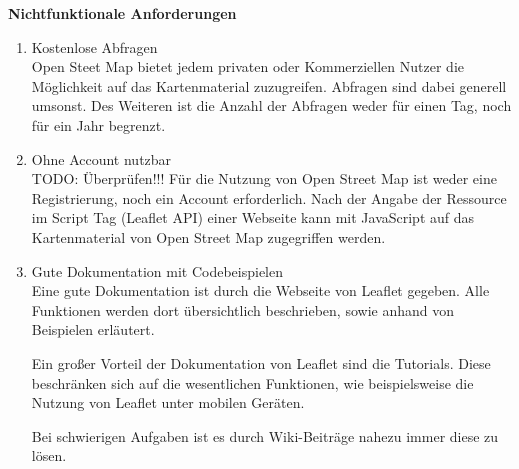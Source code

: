 \textbf{Nichtfunktionale Anforderungen}
\begin{enumerate}
\item Kostenlose Abfragen \\
Open Steet Map bietet jedem privaten oder Kommerziellen Nutzer die Möglichkeit auf das Kartenmaterial zuzugreifen. Abfragen sind dabei generell umsonst. Des Weiteren ist die Anzahl der Abfragen weder für einen Tag, noch für ein Jahr begrenzt.

\item Ohne Account nutzbar\\
TODO: Überprüfen!!!
Für die Nutzung von Open Street Map ist weder eine Registrierung, noch ein Account erforderlich. Nach der Angabe der Ressource im Script Tag (Leaflet API) einer Webseite kann mit JavaScript auf das Kartenmaterial von Open Street Map zugegriffen werden.

\item Gute Dokumentation mit Codebeispielen\\
Eine gute Dokumentation ist durch die Webseite von Leaflet gegeben. Alle Funktionen werden dort übersichtlich beschrieben, sowie anhand von Beispielen erläutert. 

Ein großer Vorteil der Dokumentation von Leaflet sind die Tutorials. Diese beschränken sich auf die wesentlichen Funktionen, wie beispielsweise die Nutzung von Leaflet unter mobilen Geräten. 

Bei schwierigen Aufgaben ist es durch Wiki-Beiträge nahezu immer diese zu lösen.


\end{enumerate}

